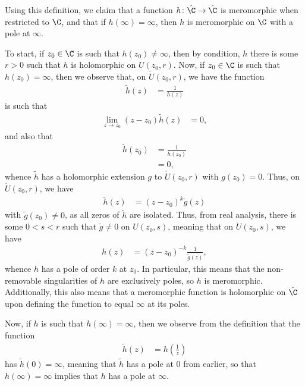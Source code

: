 \documentclass[10pt]{mypackage}
\begin{document}
\begin{solution}
  Using this definition, we claim that a function $h\colon \hat{\C}\rightarrow \hat{\C}$ is meromorphic when restricted to $\C$, and that if $h\left( \infty \right) = \infty$, then $h$ is meromorphic on $\C$ with a pole at $\infty$.\newline

  To start, if $z_0\in \C$ is such that $h\left( z_0 \right) \neq \infty$, then by condition, $h$ there is some $r > 0$ such that $h$ is holomorphic on $U\left( z_0,r \right)$. Now, if $z_0\in \C$ is such that $h\left( z_0 \right) = \infty$, then we observe that, on $\dot{U}\left( z_0,r \right)$, we have the function
  \begin{align*}
    \widetilde{h}(z) &= \frac{1}{h(z)}
  \end{align*}
  is such that
  \begin{align*}
    \lim_{z\rightarrow z_0} \left( z-z_0 \right)\widetilde{h}(z) &= 0,
  \end{align*}
  and also that
  \begin{align*}
    \widetilde{h}\left( z_0 \right) &= \frac{1}{h\left( z_0 \right)}\\
                                    &= 0,
  \end{align*}
  whence $\widetilde{h}$ has a holomorphic extension $g$ to $\dot{U}\left( z_0,r \right)$ with $g\left( z_0 \right) = 0$. Thus, on $\dot{U}\left( z_0,r \right)$, we have
  \begin{align*}
    \widetilde{h}(z) &= \left( z-z_0 \right)^{k} \widetilde{g}(z)
  \end{align*}
  with $\widetilde{g}\left( z_0 \right)\neq 0$, as all zeros of $ \widetilde{h} $ are isolated. Thus, from real analysis, there is some $0 < s < r$ such that $ \widetilde{g}\neq 0 $ on $U\left( z_0,s \right)$, meaning that on $\dot{U}\left( z_0,s \right)$, we have
  \begin{align*}
    h(z) &= \left( z-z_0 \right)^{-k} \frac{1}{\widetilde{g}(z)}, 
  \end{align*}
  whence $h$ has a pole of order $k$ at $z_0$. In particular, this means that the non-removable singularities of $h$ are exclusively poles, so $h$ is meromorphic. Additionally, this also means that a meromorphic function is holomorphic on $\hat{\C}$ upon defining the function to equal $\infty$ at its poles.\newline

  Now, if $h$ is such that $h\left( \infty \right) = \infty$, then we observe from the definition that the function
  \begin{align*}
    \widetilde{h}\left( z \right) &= h\left( \frac{1}{z} \right)
  \end{align*}
  has $\widetilde{h}\left( 0 \right) = \infty$, meaning that $\widetilde{h}$ has a pole at $0$ from earlier, so that $h\left( \infty \right) = \infty$ implies that $h$ has a pole at $\infty$.\newline


\end{solution}
\end{document}
